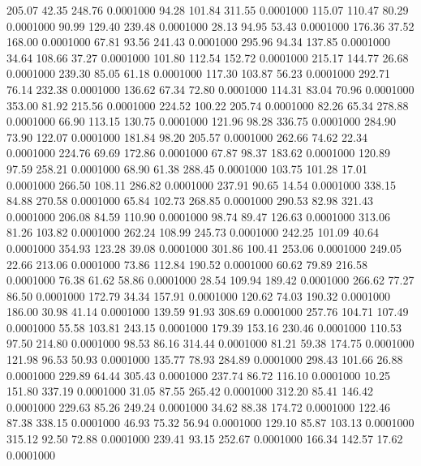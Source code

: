  205.07   42.35  248.76   0.0001000
  94.28  101.84  311.55   0.0001000
 115.07  110.47   80.29   0.0001000
  90.99  129.40  239.48   0.0001000
  28.13   94.95   53.43   0.0001000
 176.36   37.52  168.00   0.0001000
  67.81   93.56  241.43   0.0001000
 295.96   94.34  137.85   0.0001000
  34.64  108.66   37.27   0.0001000
 101.80  112.54  152.72   0.0001000
 215.17  144.77   26.68   0.0001000
 239.30   85.05   61.18   0.0001000
 117.30  103.87   56.23   0.0001000
 292.71   76.14  232.38   0.0001000
 136.62   67.34   72.80   0.0001000
 114.31   83.04   70.96   0.0001000
 353.00   81.92  215.56   0.0001000
 224.52  100.22  205.74   0.0001000
  82.26   65.34  278.88   0.0001000
  66.90  113.15  130.75   0.0001000
 121.96   98.28  336.75   0.0001000
 284.90   73.90  122.07   0.0001000
 181.84   98.20  205.57   0.0001000
 262.66   74.62   22.34   0.0001000
 224.76   69.69  172.86   0.0001000
  67.87   98.37  183.62   0.0001000
 120.89   97.59  258.21   0.0001000
  68.90   61.38  288.45   0.0001000
 103.75  101.28   17.01   0.0001000
 266.50  108.11  286.82   0.0001000
 237.91   90.65   14.54   0.0001000
 338.15   84.88  270.58   0.0001000
  65.84  102.73  268.85   0.0001000
 290.53   82.98  321.43   0.0001000
 206.08   84.59  110.90   0.0001000
  98.74   89.47  126.63   0.0001000
 313.06   81.26  103.82   0.0001000
 262.24  108.99  245.73   0.0001000
 242.25  101.09   40.64   0.0001000
 354.93  123.28   39.08   0.0001000
 301.86  100.41  253.06   0.0001000
 249.05   22.66  213.06   0.0001000
  73.86  112.84  190.52   0.0001000
  60.62   79.89  216.58   0.0001000
  76.38   61.62   58.86   0.0001000
  28.54  109.94  189.42   0.0001000
 266.62   77.27   86.50   0.0001000
 172.79   34.34  157.91   0.0001000
 120.62   74.03  190.32   0.0001000
 186.00   30.98   41.14   0.0001000
 139.59   91.93  308.69   0.0001000
 257.76  104.71  107.49   0.0001000
  55.58  103.81  243.15   0.0001000
 179.39  153.16  230.46   0.0001000
 110.53   97.50  214.80   0.0001000
  98.53   86.16  314.44   0.0001000
  81.21   59.38  174.75   0.0001000
 121.98   96.53   50.93   0.0001000
 135.77   78.93  284.89   0.0001000
 298.43  101.66   26.88   0.0001000
 229.89   64.44  305.43   0.0001000
 237.74   86.72  116.10   0.0001000
  10.25  151.80  337.19   0.0001000
  31.05   87.55  265.42   0.0001000
 312.20   85.41  146.42   0.0001000
 229.63   85.26  249.24   0.0001000
  34.62   88.38  174.72   0.0001000
 122.46   87.38  338.15   0.0001000
  46.93   75.32   56.94   0.0001000
 129.10   85.87  103.13   0.0001000
 315.12   92.50   72.88   0.0001000
 239.41   93.15  252.67   0.0001000
 166.34  142.57   17.62   0.0001000

